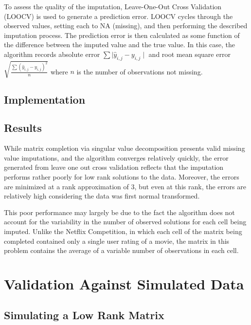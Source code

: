 \documentclass[12pt,twoside]{dukestatscithesis}
\theoremstyle{definition}
\theoremstyle{definition}
\theoremstyle{definition}
\theoremstyle{remark}
\begin{document}
To assess the quality of the imputation, Leave-One-Out Cross Validation
(LOOCV) is used to generate a prediction error. LOOCV cycles through the
observed values, setting each to NA (missing), and then performing the
described imputation process. The prediction error is then calculated as
some function of the difference between the imputed value and the true
value. In this case, the algorithm records absolute error
\(\sum \mid \hat y_{i,j} - y_{i,j}\mid\) and root mean square error
\(\sqrt{\frac{\sum (\hat y_{i,j} - y_{i,j})^2}{n}}\) where \(n\) is the
number of observations not missing.

\subsection{Implementation}\label{implementation-1}

\subsection{Results}\label{results}

While matrix completion via singular value decomposition presents valid
missing value imputations, and the algorithm converges relatively
quickly, the error generated from leave one out cross validation
reflects that the imputation performs rather poorly for low rank
solutions to the data. Moreover, the errors are minimized at a rank
approximation of 3, but even at this rank, the errors are relatively
high considering the data was first normal transformed.

This poor performance may largely be due to the fact the algorithm does
not account for the variability in the number of observed solutions for
each cell being imputed. Unlike the Netflix Competition, in which each
cell of the matrix being completed contained only a single user rating
of a movie, the matrix in this problem contains the average of a
variable number of observations in each cell.

\section{Validation Against Simulated
Data}\label{validation-against-simulated-data}

\subsection{Simulating a Low Rank
Matrix}\label{simulating-a-low-rank-matrix}
\end{document}
